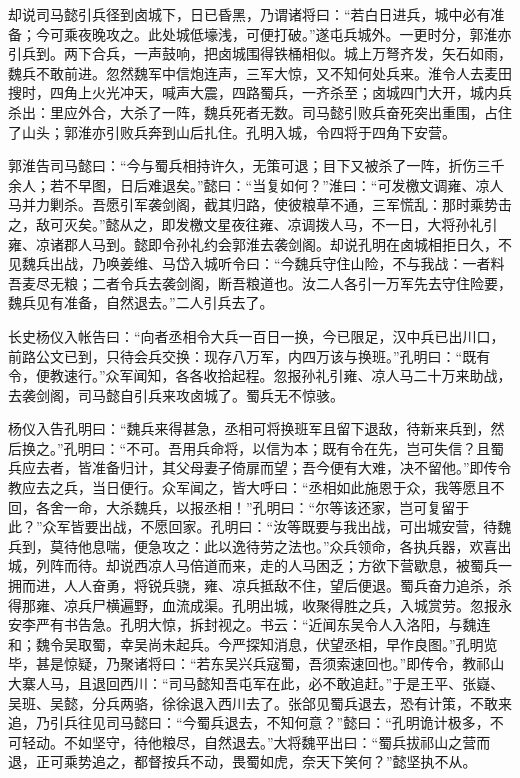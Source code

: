 却说司马懿引兵径到卤城下，日已昏黑，乃谓诸将曰：“若白日进兵，城中必有准备；今可乘夜晚攻之。此处城低壕浅，可便打破。”遂屯兵城外。一更时分，郭淮亦引兵到。两下合兵，一声鼓响，把卤城围得铁桶相似。城上万弩齐发，矢石如雨，魏兵不敢前进。忽然魏军中信炮连声，三军大惊，又不知何处兵来。淮令人去麦田搜时，四角上火光冲天，喊声大震，四路蜀兵，一齐杀至；卤城四门大开，城内兵杀出：里应外合，大杀了一阵，魏兵死者无数。司马懿引败兵奋死突出重围，占住了山头；郭淮亦引败兵奔到山后扎住。孔明入城，令四将于四角下安营。

郭淮告司马懿曰：“今与蜀兵相持许久，无策可退；目下又被杀了一阵，折伤三千余人；若不早图，日后难退矣。”懿曰：“当复如何？”淮曰：“可发檄文调雍、凉人马并力剿杀。吾愿引军袭剑阁，截其归路，使彼粮草不通，三军慌乱：那时乘势击之，敌可灭矣。”懿从之，即发檄文星夜往雍、凉调拨人马，不一日，大将孙礼引雍、凉诸郡人马到。懿即令孙礼约会郭淮去袭剑阁。却说孔明在卤城相拒日久，不见魏兵出战，乃唤姜维、马岱入城听令曰：“今魏兵守住山险，不与我战：一者料吾麦尽无粮；二者令兵去袭剑阁，断吾粮道也。汝二人各引一万军先去守住险要，魏兵见有准备，自然退去。”二人引兵去了。

长史杨仪入帐告曰：“向者丞相令大兵一百日一换，今已限足，汉中兵已出川口，前路公文已到，只待会兵交换：现存八万军，内四万该与换班。”孔明曰：“既有令，便教速行。”众军闻知，各各收拾起程。忽报孙礼引雍、凉人马二十万来助战，去袭剑阁，司马懿自引兵来攻卤城了。蜀兵无不惊骇。

杨仪入告孔明曰：“魏兵来得甚急，丞相可将换班军且留下退敌，待新来兵到，然后换之。”孔明曰：“不可。吾用兵命将，以信为本；既有令在先，岂可失信？且蜀兵应去者，皆准备归计，其父母妻子倚扉而望；吾今便有大难，决不留他。”即传令教应去之兵，当日便行。众军闻之，皆大呼曰：“丞相如此施恩于众，我等愿且不回，各舍一命，大杀魏兵，以报丞相！”孔明曰：“尔等该还家，岂可复留于此？”众军皆要出战，不愿回家。孔明曰：“汝等既要与我出战，可出城安营，待魏兵到，莫待他息喘，便急攻之：此以逸待劳之法也。”众兵领命，各执兵器，欢喜出城，列阵而待。却说西凉人马倍道而来，走的人马困乏；方欲下营歇息，被蜀兵一拥而进，人人奋勇，将锐兵骁，雍、凉兵抵敌不住，望后便退。蜀兵奋力追杀，杀得那雍、凉兵尸横遍野，血流成渠。孔明出城，收聚得胜之兵，入城赏劳。忽报永安李严有书告急。孔明大惊，拆封视之。书云：“近闻东吴令人入洛阳，与魏连和；魏令吴取蜀，幸吴尚未起兵。今严探知消息，伏望丞相，早作良图。”孔明览毕，甚是惊疑，乃聚诸将曰：“若东吴兴兵寇蜀，吾须索速回也。”即传令，教祁山大寨人马，且退回西川：“司马懿知吾屯军在此，必不敢追赶。”于是王平、张嶷、吴班、吴懿，分兵两骆，徐徐退入西川去了。张郃见蜀兵退去，恐有计策，不敢来追，乃引兵往见司马懿曰：“今蜀兵退去，不知何意？”懿曰：“孔明诡计极多，不可轻动。不如坚守，待他粮尽，自然退去。”大将魏平出曰：“蜀兵拔祁山之营而退，正可乘势追之，都督按兵不动，畏蜀如虎，奈天下笑何？”懿坚执不从。

